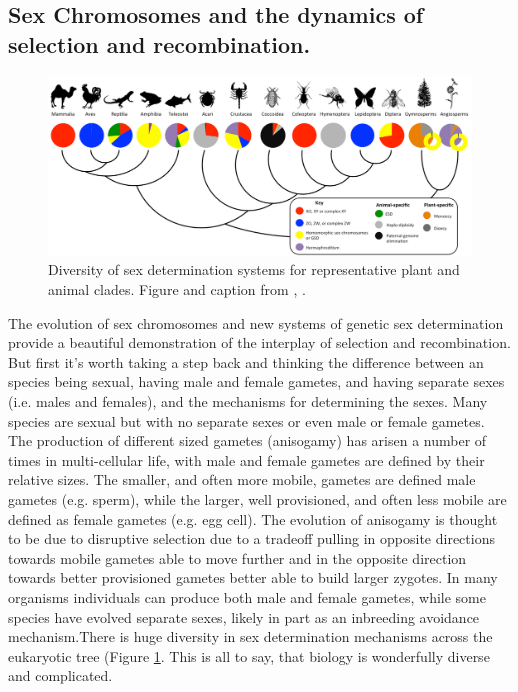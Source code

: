 \subsection{Sex Chromosomes and the dynamics of selection and recombination.}
\begin{figure} %
\begin{center}
\includegraphics[width = \textwidth]{Journal_figs/recom_selection/Sex_determ_why_so_many_ways/Tree_of_sex.png}
\end{center}
\caption{Diversity of sex determination systems for representative plant and animal clades. Figure and caption from \citet{bachtrog2014sex}, \PLOSccBY. }  \label{fig:Tree_of_sex}
\end{figure}
The evolution of sex chromosomes and new systems of genetic sex determination provide a beautiful demonstration of the interplay of selection and recombination. But first it's worth taking a step back and thinking the difference between an species being sexual, having male and female gametes, and having separate sexes (i.e. males and females), and the mechanisms for determining the sexes. Many species are sexual but with no separate sexes or even male or female gametes. The production of different sized gametes (anisogamy) has arisen a number of times in multi-cellular life, with male and female gametes are defined by their relative sizes. The smaller, and often more mobile, gametes are defined male gametes  (e.g. sperm), while the larger, well provisioned, and often less mobile are defined as female gametes (e.g. egg cell). The evolution of anisogamy is thought to be due to disruptive selection due to a tradeoff pulling in opposite directions towards mobile gametes able to move further and in the opposite direction towards better provisioned gametes better able to build larger zygotes. In many organisms individuals can produce both male and female gametes, while some species have evolved separate sexes, likely in part as an inbreeding avoidance mechanism.There is huge diversity in sex determination mechanisms across the eukaryotic tree (Figure \ref{fig:Tree_of_sex}. This is all to say, that biology is wonderfully diverse and complicated.

